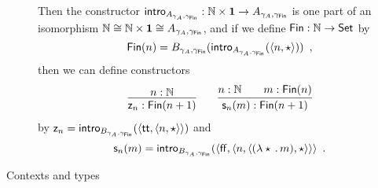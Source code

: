 \documentclass{article}
\begin{document}
\begin{description}
  Then the constructor $\mathsf{intro}_{A_{\gamma_A, \gamma_{\mathsf{Fin}}}} : \mathbb{N} \times \mathbf{1} \to
  A_{\gamma_A, \gamma_{\mathsf{Fin}}}$ is one part of an isomorphism $\mathbb{N}
  \cong \mathbb{N} \times \mathbf{1} \cong A_{\gamma_A, \gamma_{\mathsf{Fin}}}$, and if we
  define $\mathsf{Fin} : \mathbb{N} \to \mathsf{Set}$ by 
  \[
  \mathsf{Fin}(n) = B_{\gamma_A, \gamma_{\mathsf{Fin}}}(\mathsf{intro}_{A_{\gamma_A,  \gamma_{\mathsf{Fin}}}}(\langle n , \star\rangle)) \enspace ,
  \] 
  then we can define constructors
  \begin{align*}
    \infer{\finzero{n} : \Fin(n + 1)}{n : \Nat} \qquad
\infer{\finsucc{n}{m} : \Fin(n + 1)}{n : \Nat & \quad m : \Fin(n)}
  \end{align*}
  by $\mathsf{z}_{n} = \mathsf{intro}_{B_{\gamma_A,
      \gamma_{\mathsf{Fin}}}}(\langle \mathsf{tt} , \langle n , \star\rangle\rangle)$ and
  \[
  \mathsf{s}_{n}(m) = \mathsf{intro}_{B_{\gamma_A,
      \gamma_{\mathsf{Fin}}}}(\langle \mathsf{ff} , \langle n , \langle (\lambda
        \star\,.\,m) , \star\rangle\rangle\rangle \enspace .
  \]








\item[Contexts and types]


\end{description}
\end{document}
